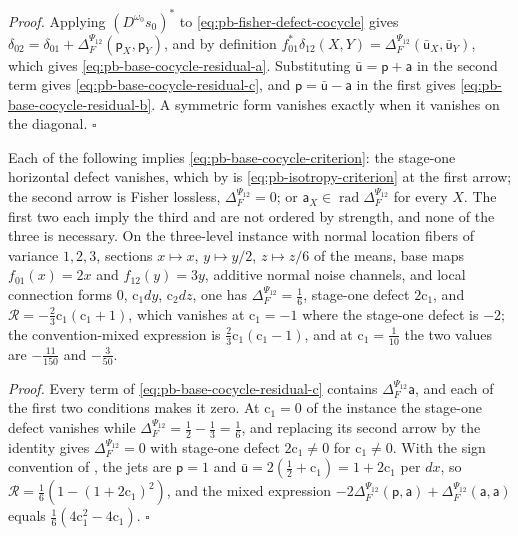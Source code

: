 \noindent\emph{Proof.}
Applying \((D^{\omega_0}s_0)^*\) to \eqref{eq:pb-fisher-defect-cocycle} gives
\(\delta_{02}=\delta_{01}+\Delta_F^{\Psi_{12}}(\mathsf p_X,\mathsf p_Y)\), and by definition
\(f_{01}^*\delta_{12}(X,Y)=\Delta_F^{\Psi_{12}}(\bar{\mathsf u}_X,\bar{\mathsf u}_Y)\), which gives
\eqref{eq:pb-base-cocycle-residual-a}. Substituting \(\bar{\mathsf u}=\mathsf p+\mathsf a\) in the second
term gives \eqref{eq:pb-base-cocycle-residual-c}, and \(\mathsf p=\bar{\mathsf u}-\mathsf a\) in the
first gives \eqref{eq:pb-base-cocycle-residual-b}. A symmetric form vanishes exactly when it vanishes on
the diagonal. \hfill$\square$

Each of the following implies \eqref{eq:pb-base-cocycle-criterion}: the stage-one horizontal defect
vanishes, which by  is \eqref{eq:pb-isotropy-criterion} at the first
arrow; the second arrow is Fisher lossless, \(\Delta_F^{\Psi_{12}}=0\); or
\(\mathsf a_X\in\operatorname{rad}\Delta_F^{\Psi_{12}}\) for every \(X\). The first two each imply the
third and are not ordered by strength, and none of the three is necessary. On the three-level
instance with normal location fibers of variance \(1,2,3\), sections \(x\mapsto x\), \(y\mapsto y/2\),
\(z\mapsto z/6\) of the means, base maps \(f_{01}(x)=2x\) and \(f_{12}(y)=3y\), additive normal noise
channels, and local connection forms \(0\), \(\mathrm c_1dy\), \(\mathrm c_2dz\), one has
\(\Delta_F^{\Psi_{12}}=\tfrac16\), stage-one defect \(2\mathrm c_1\), and
\(\mathcal R=-\tfrac23\mathrm c_1(\mathrm c_1+1)\), which vanishes at \(\mathrm c_1=-1\) where the
stage-one defect is \(-2\); the convention-mixed expression is \(\tfrac23\mathrm c_1(\mathrm c_1-1)\), and
at \(\mathrm c_1=\tfrac1{10}\) the two values are \(-\tfrac{11}{150}\) and \(-\tfrac3{50}\).

\noindent\emph{Proof.}
Every term of \eqref{eq:pb-base-cocycle-residual-c} contains \(\Delta_F^{\Psi_{12}}\mathsf a\), and each
of the first two conditions makes it zero. At \(\mathrm c_1=0\) of the instance the stage-one defect
vanishes while \(\Delta_F^{\Psi_{12}}=\tfrac12-\tfrac13=\tfrac16\), and replacing its second arrow by the
identity gives \(\Delta_F^{\Psi_{12}}=0\) with stage-one defect \(2\mathrm c_1\ne0\) for
\(\mathrm c_1\ne0\). With the sign convention of , the jets are
\(\mathsf p=1\) and \(\bar{\mathsf u}=2(\tfrac12+\mathrm c_1)=1+2\mathrm c_1\) per \(dx\), so
\(\mathcal R=\tfrac16(1-(1+2\mathrm c_1)^2)\), and the mixed expression
\(-2\Delta_F^{\Psi_{12}}(\mathsf p,\mathsf a)+\Delta_F^{\Psi_{12}}(\mathsf a,\mathsf a)\) equals
\(\tfrac16(4\mathrm c_1^2-4\mathrm c_1)\). \hfill$\square$

